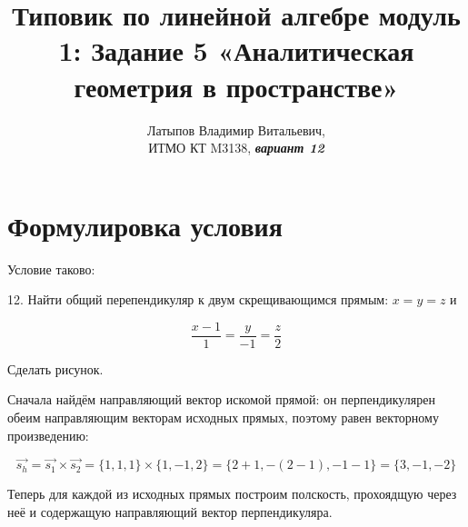 \documentclass[12pt, a4paper]{article}
\author{Латыпов Владимир Витальевич, \\ ИТМО КТ M3138, \Huge{\textit{\textbf{вариант 12}}}}
\title{Типовик по линейной алгебре модуль 1: Задание 5 «Аналитическая геометрия в пространстве»}
\begin{document}
    \tittoc

    \section{Формулировка условия}

    \begin{statement}
        Условие таково: 
        
        12. Найти общий перепендикуляр к двум скрещивающимся прямым:
        $x = y = z$ и
        
        \begin{equation}
            \frac{x − 1}{1} = \frac{y}{-1} = \frac{z}{2}
        \end{equation}

        Сделать рисунок.
    \end{statement}

    Сначала найдём направляющий вектор искомой прямой: 
    он перпендикулярен обеим направляющим векторам исходных прямых,
    поэтому равен векторному произведению:

    \begin{equation}
        \vec{s_h} = \vec{s_1} \times \vec{s_2} 
        = \{ 1, 1, 1 \} \times \{ 1, -1, 2 \} = 
        \{ 2 + 1, -(2 - 1), -1 - 1 \} = \{ 3, -1, -2 \}
    \end{equation}

    Теперь для каждой из исходных прямых построим полскость, 
    прохоядщую через неё 
    и содержащую направляющий вектор перпендикуляра.
\end{document}
